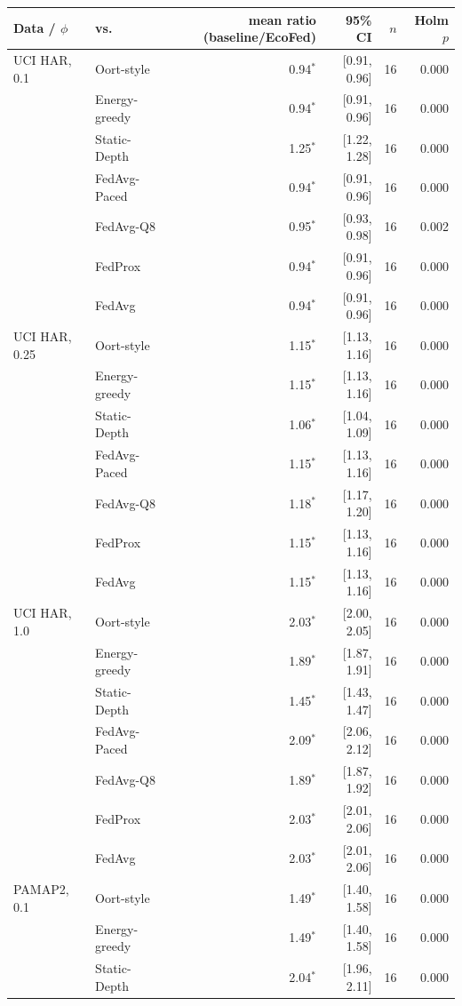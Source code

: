 \begin{tabular}{@{}llrrrr@{}}
\toprule
Data / $\phi$ & vs. & mean ratio (baseline/EcoFed) & 95\% CI & $n$ & Holm $p$\\
\midrule
UCI HAR, 0.1 & Oort-style & 0.94$^{*}$ & [0.91, 0.96] & 16 & 0.000\\
 & Energy-greedy & 0.94$^{*}$ & [0.91, 0.96] & 16 & 0.000\\
 & Static-Depth & 1.25$^{*}$ & [1.22, 1.28] & 16 & 0.000\\
 & FedAvg-Paced & 0.94$^{*}$ & [0.91, 0.96] & 16 & 0.000\\
 & FedAvg-Q8 & 0.95$^{*}$ & [0.93, 0.98] & 16 & 0.002\\
 & FedProx & 0.94$^{*}$ & [0.91, 0.96] & 16 & 0.000\\
 & FedAvg & 0.94$^{*}$ & [0.91, 0.96] & 16 & 0.000\\
\midrule
UCI HAR, 0.25 & Oort-style & 1.15$^{*}$ & [1.13, 1.16] & 16 & 0.000\\
 & Energy-greedy & 1.15$^{*}$ & [1.13, 1.16] & 16 & 0.000\\
 & Static-Depth & 1.06$^{*}$ & [1.04, 1.09] & 16 & 0.000\\
 & FedAvg-Paced & 1.15$^{*}$ & [1.13, 1.16] & 16 & 0.000\\
 & FedAvg-Q8 & 1.18$^{*}$ & [1.17, 1.20] & 16 & 0.000\\
 & FedProx & 1.15$^{*}$ & [1.13, 1.16] & 16 & 0.000\\
 & FedAvg & 1.15$^{*}$ & [1.13, 1.16] & 16 & 0.000\\
\midrule
UCI HAR, 1.0 & Oort-style & 2.03$^{*}$ & [2.00, 2.05] & 16 & 0.000\\
 & Energy-greedy & 1.89$^{*}$ & [1.87, 1.91] & 16 & 0.000\\
 & Static-Depth & 1.45$^{*}$ & [1.43, 1.47] & 16 & 0.000\\
 & FedAvg-Paced & 2.09$^{*}$ & [2.06, 2.12] & 16 & 0.000\\
 & FedAvg-Q8 & 1.89$^{*}$ & [1.87, 1.92] & 16 & 0.000\\
 & FedProx & 2.03$^{*}$ & [2.01, 2.06] & 16 & 0.000\\
 & FedAvg & 2.03$^{*}$ & [2.01, 2.06] & 16 & 0.000\\
\midrule
PAMAP2, 0.1 & Oort-style & 1.49$^{*}$ & [1.40, 1.58] & 16 & 0.000\\
 & Energy-greedy & 1.49$^{*}$ & [1.40, 1.58] & 16 & 0.000\\
 & Static-Depth & 2.04$^{*}$ & [1.96, 2.11] & 16 & 0.000\\

\end{tabular}
